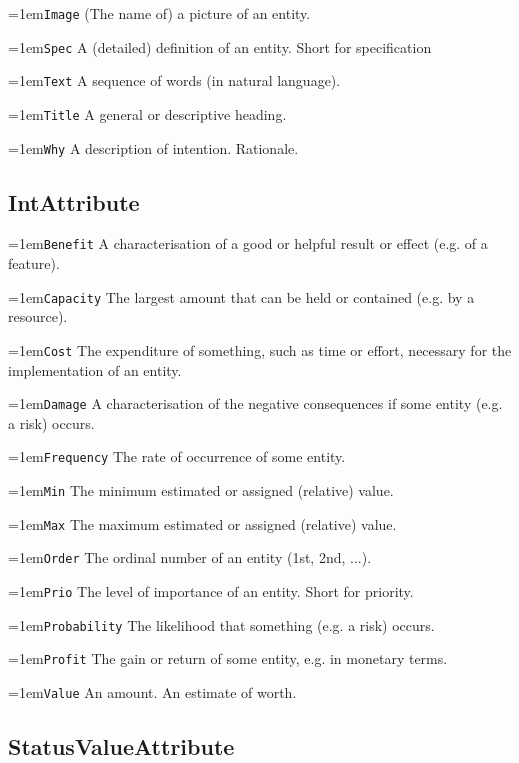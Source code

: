 \documentclass[9pt,a4paper,oneside]{report}
\begin{document}
\begin{multicols*}{4}
\hangindent=1em\lstinline+Image+ (The name of) a picture of an entity.

\hangindent=1em\lstinline+Spec+ A (detailed) definition of an entity. Short for specification

\hangindent=1em\lstinline+Text+ A sequence of words (in natural language).

\hangindent=1em\lstinline+Title+ A general or descriptive heading.

\hangindent=1em\lstinline+Why+ A description of intention. Rationale.

\subsection*{IntAttribute}

\hangindent=1em\lstinline+Benefit+ A characterisation of a good or helpful result or effect (e.g. of a feature).

\hangindent=1em\lstinline+Capacity+ The largest amount that can be held or contained (e.g. by a resource).

\hangindent=1em\lstinline+Cost+ The expenditure of something, such as time or effort, necessary for the implementation of an entity.

\hangindent=1em\lstinline+Damage+ A characterisation of the negative consequences if some entity (e.g. a risk) occurs.

\hangindent=1em\lstinline+Frequency+ The rate of occurrence of some entity. 

\hangindent=1em\lstinline+Min+ The minimum estimated or assigned (relative) value.

\hangindent=1em\lstinline+Max+ The maximum estimated or assigned (relative) value.

\hangindent=1em\lstinline+Order+ The ordinal number of an entity (1st, 2nd, ...).

\hangindent=1em\lstinline+Prio+ The level of importance of an entity. Short for priority.

\hangindent=1em\lstinline+Probability+ The likelihood that something (e.g. a risk) occurs.

\hangindent=1em\lstinline+Profit+ The gain or return of some entity, e.g. in monetary terms.

\hangindent=1em\lstinline+Value+ An amount. An estimate of worth.

\subsection*{StatusValueAttribute}


\end{multicols*}
\end{document}
